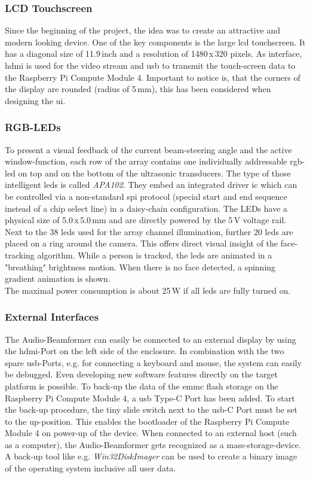 \subsubsection{LCD Touchscreen}
Since the beginning of the project, the idea was to create an attractive and modern looking device. One of the key components is the large \acrshort{lcd} touchscreen. It has a diagonal size of 11.9\,inch and a resolution of 1480\,x\,320 pixels. As interface, \acrshort{hdmi} is used for the video stream and \acrshort{usb} to transmit the touch-screen data to the Raspberry Pi Compute Module 4. Important to notice is, that the corners of the display are rounded (radius of 5\,mm), this has been considered when designing the \acrlong{ui}.

\subsubsection{RGB-LEDs}
To present a visual feedback of the current beam-steering angle and the active window-function, each row of the array contains one individually addressable \acrshort{rgb}-\acrshort{led} on top and on the bottom of the ultrasonic transducers. The type of those intelligent \acrshort{led}s is called \textit{APA102}. They embed an integrated driver \acrshort{ic} which can be controlled via a non-standard \acrshort{spi} protocol (special start and end sequence instead of a chip select line) in a daisy-chain configuration. The LEDs have a physical size of 5.0\,x\,5.0\,mm and are directly powered by the 5\,V voltage rail.\\
Next to the 38 \acrshort{led}s used for the array channel illumination, further 20 \acrshort{led}s are placed on a ring around the camera. This offers direct visual insight of the face-tracking algorithm. While a person is tracked, the \acrshort{led}s are animated in a "breathing" brightness motion. When there is no face detected, a spinning gradient animation is shown.\\
The maximal power consumption is about 25\,W if all \acrshort{led}s are fully turned on.

\subsubsection{External Interfaces}
The Audio-Beamformer can easily be connected to an external display by using the \acrshort{hdmi}-Port on the left side of the enclosure. In combination with the two spare \acrshort{usb}-Ports, e.g. for connecting a keyboard and mouse, the system can easily be debugged. Even developing new software features directly on the target platform is possible. To back-up the data of the \acrshort{emmc} flash storage on the Raspberry Pi Compute Module 4, a  \acrshort{usb} Type-C Port has been added. To start the back-up procedure, the tiny slide switch next to the \acrshort{usb}-C Port must be set to the up-position. This enables the bootloader of the Raspberry Pi Compute Module 4 on power-up of the device. When connected to an external host (such as a computer), the Audio-Beamformer gets recognized as a mass-storage-device. A back-up tool like e.g. \textit{Win32DiskImager} can be used to create a binary image of the operating system inclusive all user data.

